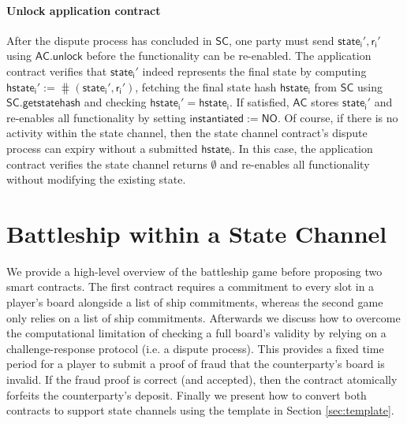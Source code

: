 \documentclass{llncs}
\newcommand{\instantiated}{\mathsf{instantiated}}
\newcommand{\instantiatedno}{\mathsf{NO}}
\newcommand{\hslot}{\mathsf{hslot}}
\newcommand{\hship}{\mathsf{hship}}
\newcommand{\hstatei}{\mathsf{hstate}_{\monotoniccounter}}
\newcommand{\monotoniccounter}{\mathsf{i}}
\newcommand{\stateinfoi}{\mathsf{state}_{\mathsf{i}}}
\newcommand{\rani}{\mathsf{r}_{\mathsf{i}}}
\newcommand{\statechannel}{\mathsf{SC}}
\newcommand{\statechannelgetcommitment}{\mathsf{SC}.\mathsf{getstatehash}}
\newcommand{\appcontract}{\mathsf{AC}}
\newcommand{\appunlock}{\mathsf{AC.unlock}}
\begin{document}
\paragraph{Unlock application contract}

After the dispute process has concluded in $\statechannel$, one party must send  $\stateinfoi',\rani'$ using $\appunlock$ before the functionality can be re-enabled.
The application contract verifies that $\stateinfoi'$  indeed represents the final state by computing $\hstatei' := \hash(\stateinfoi', \rani')$, fetching the final state hash $\hstatei$ from $\statechannel$ using $\statechannelgetcommitment$ and checking  $\hstatei' = \hstatei$. 
If satisfied, $\appcontract$ stores $\stateinfoi'$ and re-enables all functionality by setting $\instantiated :=  \instantiatedno$. 
Of course, if there is no activity within the state channel, then the state channel contract's dispute process can expiry without a submitted $\hstatei$.
In this case, the application contract verifies the state channel returns $\emptyset$ and re-enables all functionality without modifying the existing state. 



\section{Battleship within a State Channel} 

We provide a high-level overview of the battleship game before proposing two smart contracts. 
The first contract requires a commitment to every slot in a player's board alongside a list of ship commitments, whereas the second game only relies on a list of ship commitments. 
Afterwards we discuss how to overcome the computational limitation of checking a full board's validity by relying on a challenge-response protocol (i.e. a dispute process).
This provides a fixed time period for a player to submit a proof of fraud that the counterparty's board is invalid.
If the fraud proof is correct (and accepted), then the contract atomically forfeits the counterparty's deposit. 
Finally we present how to convert both contracts to support state channels using the template in Section \ref{sec:template}. 
\end{document}
